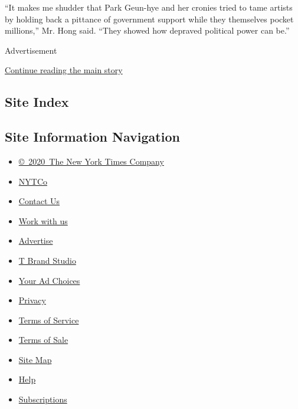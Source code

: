 ``It makes me shudder that Park Geun-hye and her cronies tried to tame
artists by holding back a pittance of government support while they
themselves pocket millions,'' Mr. Hong said. ``They showed how depraved
political power can be.''

Advertisement

\protect\hyperlink{after-bottom}{Continue reading the main story}

\hypertarget{site-index}{%
\subsection{Site Index}\label{site-index}}

\hypertarget{site-information-navigation}{%
\subsection{Site Information
Navigation}\label{site-information-navigation}}

\begin{itemize}
\tightlist
\item
  \href{https://help.nytimes3xbfgragh.onion/hc/en-us/articles/115014792127-Copyright-notice}{©~2020~The
  New York Times Company}
\end{itemize}

\begin{itemize}
\tightlist
\item
  \href{https://www.nytco.com/}{NYTCo}
\item
  \href{https://help.nytimes3xbfgragh.onion/hc/en-us/articles/115015385887-Contact-Us}{Contact
  Us}
\item
  \href{https://www.nytco.com/careers/}{Work with us}
\item
  \href{https://nytmediakit.com/}{Advertise}
\item
  \href{http://www.tbrandstudio.com/}{T Brand Studio}
\item
  \href{https://www.nytimes3xbfgragh.onion/privacy/cookie-policy\#how-do-i-manage-trackers}{Your
  Ad Choices}
\item
  \href{https://www.nytimes3xbfgragh.onion/privacy}{Privacy}
\item
  \href{https://help.nytimes3xbfgragh.onion/hc/en-us/articles/115014893428-Terms-of-service}{Terms
  of Service}
\item
  \href{https://help.nytimes3xbfgragh.onion/hc/en-us/articles/115014893968-Terms-of-sale}{Terms
  of Sale}
\item
  \href{https://spiderbites.nytimes3xbfgragh.onion}{Site Map}
\item
  \href{https://help.nytimes3xbfgragh.onion/hc/en-us}{Help}
\item
  \href{https://www.nytimes3xbfgragh.onion/subscription?campaignId=37WXW}{Subscriptions}
\end{itemize}
